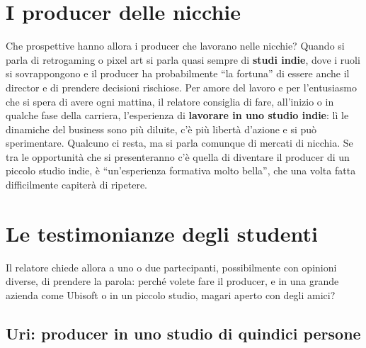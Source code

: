 \section{I producer delle nicchie}
\label{sec:z5-nicchie}

Che prospettive hanno allora i producer che lavorano nelle nicchie? Quando si
parla di retrogaming o pixel art si parla quasi sempre di \textbf{studi indie},
dove i ruoli si sovrappongono e il producer ha probabilmente ``la fortuna'' di
essere anche il director e di prendere decisioni rischiose. Per amore del lavoro
e per l'entusiasmo che si spera di avere ogni mattina, il relatore consiglia di
fare, all'inizio o in qualche fase della carriera, l'esperienza di
\textbf{lavorare in uno studio indie}: lì le dinamiche del business sono più
diluite, c'è più libertà d'azione e si può sperimentare. Qualcuno ci resta, ma
si parla comunque di mercati di nicchia. Se tra le opportunità che si
presenteranno c'è quella di diventare il producer di un piccolo studio indie,
è ``un'esperienza formativa molto bella'', che una volta fatta difficilmente
capiterà di ripetere.

\section{Le testimonianze degli studenti}
\label{sec:z5-testimonianze}

Il relatore chiede allora a uno o due partecipanti, possibilmente con opinioni
diverse, di prendere la parola: perché volete fare il producer, e in una grande
azienda come Ubisoft o in un piccolo studio, magari aperto con degli amici?

\subsection{Uri: producer in uno studio di quindici persone}

